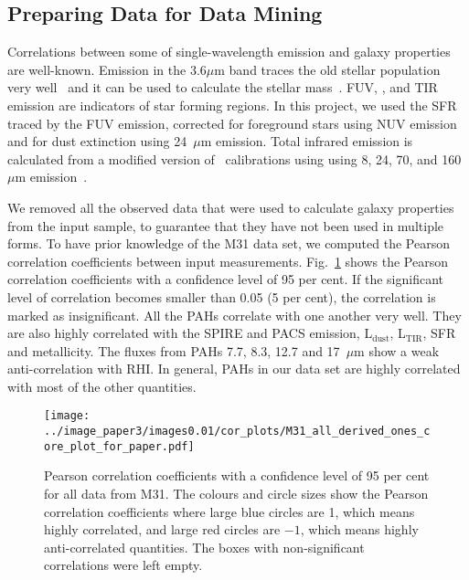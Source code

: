      \subsection{Preparing Data for Data Mining}
    
     Correlations between some of single-wavelength emission and galaxy properties are well-known.
     Emission in the 3.6$\mu$m band traces the old stellar population very well~\citep[e.g.][]{Smith07a,Leitherer99} and it can be used to calculate the stellar mass~\citep{Eskew12}.
     FUV, \halphadot, and TIR emission are indicators of star forming regions.
     In this project, we used the SFR traced by the FUV emission, corrected for foreground stars using NUV emission and for dust extinction using 24~$\mu$m emission.
     Total infrared emission is calculated from a modified version of~\cite{Draine07} calibrations using using 8, 24, 70, and 160~$\mu$m emission~\citep{Boquien10}.
    
    
    We removed all the observed data that were used to calculate galaxy properties from the input sample, to guarantee that they have not been used in multiple forms.
    To have prior knowledge of the M31 data set, 
    we computed the Pearson correlation coefficients between input measurements.
    Fig.~\ref{fig: cor_all} shows the Pearson correlation coefficients with a confidence level of 95 per cent. 
    If the significant level of correlation becomes smaller than 0.05 (5 per cent), the correlation is marked as insignificant. 
    All the PAHs correlate with one another very well.
    They are also highly correlated with the SPIRE and PACS emission, L$_\mathrm{dust}$, L$_\mathrm{TIR}$, SFR and metallicity.
    The fluxes from PAHs 7.7, 8.3, 12.7 and 17~$\mu$m show a weak anti-correlation with RHI.
    In general, PAHs in our data set are highly correlated with most of the other quantities. 
    
      \begin{figure}
        \centering
        \texttt{[image: ../image\_paper3/images0.01/cor\_plots/M31\_all\_derived\_ones\_core\_plot\_for\_paper.pdf]}
        \caption[Pearson correlation coefficients for data from 10 regions in M31]{Pearson correlation coefficients with a confidence level of 95 per cent for all data from M31. The colours and circle sizes show the Pearson correlation coefficients where large blue circles are 1, which means highly correlated, and large red circles are $-1$, which means highly anti-correlated quantities. The boxes with non-significant correlations were left empty.}
        \label{fig: cor_all}
    \end{figure}
 
